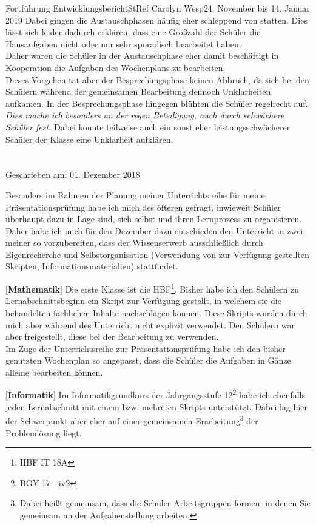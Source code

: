 \documentclass[oneside,openany,headings=optiontotoc,11pt,numbers=noenddot]{article}
\begin{document}
\begin{worksheet}{Fortführung Entwicklungsbericht}{StRef\grq{} Carolyn Wesp}{24. November bis 14. Januar 2019}
{		Dabei gingen die Austauschphasen häufig eher schleppend von statten. Dies lässt sich leider dadurch erklären, dass eine Großzahl der Schüler die Hausaufgaben nicht oder nur sehr sporadisch bearbeitet haben.\\
		Daher waren die Schüler in der Austauschphase eher damit beschäftigt in Kooperation die Aufgaben des Wochenplans zu bearbeiten.\\
		Dieses Vorgehen tat aber der Besprechungsphase keinen Abbruch, da sich bei den Schülern während der gemeinsamen Bearbeitung dennoch Unklarheiten aufkamen. In der Besprechungsphase hingegen blühten die Schüler regelrecht auf. \textit{Dies mache ich besonders an der regen Beteiligung, auch durch schwächere Schüler fest.} Dabei konnte teilweise auch ein sonst eher leistungsschwächerer Schüler der Klasse eine Unklarheit aufklären.}
		\par
		\setlength{\leftskip}{0cm}
		\noindent
		
		\section*{}
		\tiny{Geschrieben am: 01. Dezember 2018}\small\\
		\par\noindent
		Besonders im Rahmen der Planung meiner Unterrichtsreihe für meine Präsentationsprüfung habe ich mich des öfteren gefragt, inwieweit Schüler überhaupt dazu in Lage sind, sich selbst und ihren Lernprozess zu organisieren.\\
		Daher habe ich mich für den Dezember dazu entschieden den Unterricht in zwei meiner so vorzubereiten, dass der Wissenserwerb ausschließlich durch Eigenrecherche und Selbstorganisation (Verwendung von zur Verfügung gestellten Skripten, Informationsmaterialien) stattfindet.\\
		\par\noindent
		\color{ma}
		$\lbrack$\textbf{Mathematik}$\rbrack$ Die erste Klasse ist die HBF\footnote{HBF IT 18A}. Bisher habe ich den Schülern zu Lernabschnittsbeginn ein Skript zur Verfügung gestellt, in welchem sie die behandelten fachlichen Inhalte nachschlagen können. Diese Skripts wurden durch mich aber während des Unterricht nicht explizit verwendet. Den Schülern war aber freigestellt, diese bei der Bearbeitung zu verwenden.\\
		Im Zuge der Unterrichtsreihe zur Präsentationsprüfung habe ich den bisher genutzten Wochenplan so angepasst, dass die Schüler die Aufgaben in Gänze alleine bearbeiten können.\\
		\par\noindent
		\color{iv}
		$\mathbf{\lbrack}$\textbf{Informatik}$\mathbf{\rbrack}$ Im Informatikgrundkurs der Jahrgangsstufe 12\footnote{BGY 17 - iv2} habe ich ebenfalls jeden Lernabschnitt mit einem bzw. mehreren Skripts unterstützt. Dabei lag hier der Schwerpunkt aber eher auf einer gemeinsamen Erarbeitung\footnote{Dabei heißt gemeinsam, dass die Schüler Arbeitsgruppen formen, in denen Sie gemeinsam an der Aufgabenstellung arbeiten.} der Problemlösung liegt.\\
		\normalcolor

\end{worksheet}
\end{document}
